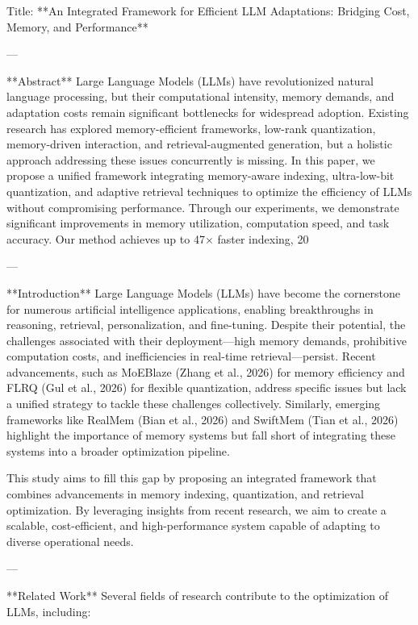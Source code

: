 Title: **An Integrated Framework for Efficient LLM Adaptations: Bridging Cost, Memory, and Performance**

---

**Abstract**  
Large Language Models (LLMs) have revolutionized natural language processing, but their computational intensity, memory demands, and adaptation costs remain significant bottlenecks for widespread adoption. Existing research has explored memory-efficient frameworks, low-rank quantization, memory-driven interaction, and retrieval-augmented generation, but a holistic approach addressing these issues concurrently is missing. In this paper, we propose a unified framework integrating memory-aware indexing, ultra-low-bit quantization, and adaptive retrieval techniques to optimize the efficiency of LLMs without compromising performance. Through our experiments, we demonstrate significant improvements in memory utilization, computation speed, and task accuracy. Our method achieves up to 47× faster indexing, 20%

---

**Introduction**  
Large Language Models (LLMs) have become the cornerstone for numerous artificial intelligence applications, enabling breakthroughs in reasoning, retrieval, personalization, and fine-tuning. Despite their potential, the challenges associated with their deployment—high memory demands, prohibitive computation costs, and inefficiencies in real-time retrieval—persist. Recent advancements, such as MoEBlaze (Zhang et al., 2026) for memory efficiency and FLRQ (Gul et al., 2026) for flexible quantization, address specific issues but lack a unified strategy to tackle these challenges collectively. Similarly, emerging frameworks like RealMem (Bian et al., 2026) and SwiftMem (Tian et al., 2026) highlight the importance of memory systems but fall short of integrating these systems into a broader optimization pipeline.

This study aims to fill this gap by proposing an integrated framework that combines advancements in memory indexing, quantization, and retrieval optimization. By leveraging insights from recent research, we aim to create a scalable, cost-efficient, and high-performance system capable of adapting to diverse operational needs.

---

**Related Work**  
Several fields of research contribute to the optimization of LLMs, including:

